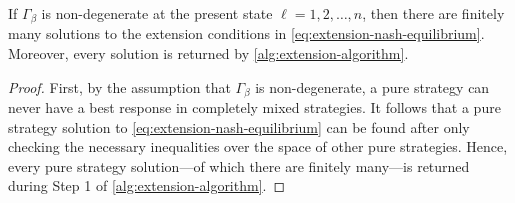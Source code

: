     \begin{proposition} \label{prop:extension-algorithm-verification}
        If $\Gamma_\beta$ is non-degenerate at the present state $\ell = 1, 2, \ldots, n$, then there are finitely many solutions to the extension conditions in \eqref{eq:extension-nash-equilibrium}.
        Moreover, every solution is returned by \autoref{alg:extension-algorithm}.
    \end{proposition}
    
    \begin{proof}
        First, by the assumption that $\Gamma_\beta$ is non-degenerate, a pure strategy can never have a best response in completely mixed strategies.
        It follows that a pure strategy solution to \eqref{eq:extension-nash-equilibrium} can be found after only checking the necessary inequalities over the space of other pure strategies.
        Hence, every pure strategy solution---of which there are finitely many---is returned during Step 1 of \autoref{alg:extension-algorithm}.


\end{proof}
